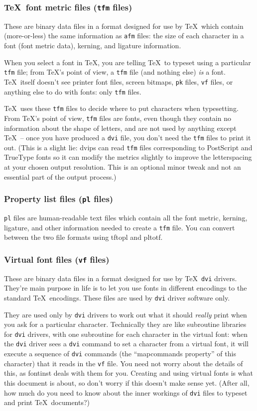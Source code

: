 \documentclass[a4paper]{ltxguide}
\newcommand{\PS}{Post\-Script\xspace}
\newcommand{\TT}{True\-Type\xspace}
\newcommand*{\setfilename}[1]{\texttt{#1}}
\newcommand*{\setpackagename}[1]{\textsf{#1}}
\newcommand{\dvips}   {\setpackagename{dvips}\xspace}
\newcommand{\fontinst}{\setpackagename{font\-inst}\xspace}
\newcommand{\vf} {\setfilename{vf}\xspace}
\newcommand{\pl} {\setfilename{pl}\xspace}
\newcommand{\pk} {\setfilename{pk}\xspace}
\newcommand{\afm}{\setfilename{afm}\xspace}
\newcommand{\tfm}{\setfilename{tfm}\xspace}
\newcommand{\dvi}{\setfilename{dvi}\xspace}
\newcommand{\pltotf}{\setpackagename{pltotf}\xspace}
\newcommand{\tftopl}{\setpackagename{tftopl}\xspace}
\begin{document}
\subsubsection{\TeX\ font metric files (\tfm files)}

These are binary data files in a format designed for use by \TeX\
which contain (more-or-less) the same information as \afm files:
the size of each character in a font (font metric data), kerning,
and ligature information.

When you select a font in \TeX, you are telling \TeX\ to typeset
using a particular \tfm file; from \TeX's point of view, a \tfm
file (and nothing else) \emph{is} a font.  \TeX\ itself doesn't
see printer font files, screen bitmaps, \pk files, \vf files, or
anything else to do with fonts: only \tfm files.

\TeX\ uses these \tfm files to decide where to put characters when
typesetting.  From \TeX's point of view, \tfm files are fonts,
even though they contain no information about the shape of
letters, and are not used by anything except \TeX\ -- once you
have produced a \dvi file, you don't need the \tfm files to print
it out.  (This is a slight lie: \dvips can read \tfm files
corresponding to \PS and \TT fonts so it can modify the metrics
slightly to improve the letterspacing at your chosen output
resolution.  This is an optional minor tweak and not an essential
part of the output process.)


\subsubsection{Property list files (\pl files)}

\pl files are human-readable text files which contain all the font
metric, kerning, ligature, and other information needed to create
a \tfm file.  You can convert between the two file formats using
\tftopl and \pltotf.


\subsubsection{Virtual font files (\vf files)}

These are binary data files in a format designed for use by \TeX\
\dvi drivers.  They're main purpose in life is to let you use
fonts in different encodings to the standard \TeX\ encodings.
These files are used by \dvi driver software only.

They are used only by \dvi drivers to work out what it should
\emph{really} print when you ask for a particular character. 
Technically they are like subroutine libraries for \dvi drivers, 
with one subroutine for each character in the virtual font: when 
the \dvi driver sees a \dvi command to set a character from a virtual 
font, it will execute a sequence of \dvi commands (the ``mapcommands 
property'' of this character) that it reads in the \vf file. You need 
not worry about the details of this, as \fontinst deals with them for 
you. Creating and using virtual fonts is what this document is about,
so don't worry if this doesn't make sense yet. (After all, how much 
do you need to know about the inner workings of \dvi files to typeset 
and print \TeX\ documents?)
\end{document}
